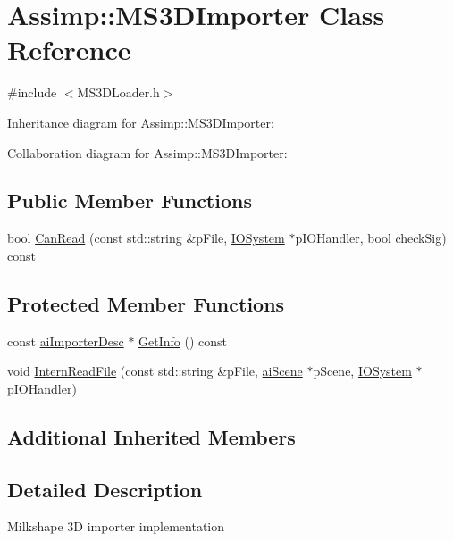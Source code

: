 \hypertarget{class_assimp_1_1_m_s3_d_importer}{\section{Assimp\+:\+:M\+S3\+D\+Importer Class Reference}
\label{class_assimp_1_1_m_s3_d_importer}
}


{\ttfamily \#include $<$M\+S3\+D\+Loader.\+h$>$}



Inheritance diagram for Assimp\+:\+:M\+S3\+D\+Importer\+:


Collaboration diagram for Assimp\+:\+:M\+S3\+D\+Importer\+:
\subsection*{Public Member Functions}
\begin{DoxyCompactItemize}
\item 
bool \hyperlink{class_assimp_1_1_m_s3_d_importer_ab3da09f930bba981ec97f32dffe1c23b}{Can\+Read} (const std\+::string \&p\+File, \hyperlink{class_assimp_1_1_i_o_system}{I\+O\+System} $\ast$p\+I\+O\+Handler, bool check\+Sig) const 
\end{DoxyCompactItemize}
\subsection*{Protected Member Functions}
\begin{DoxyCompactItemize}
\item 
const \hyperlink{structai_importer_desc}{ai\+Importer\+Desc} $\ast$ \hyperlink{class_assimp_1_1_m_s3_d_importer_a4546d12a0844b8f3f23c26924f95df03}{Get\+Info} () const 
\item 
void \hyperlink{class_assimp_1_1_m_s3_d_importer_a9784f255e62ab45c8232f83b27dd6762}{Intern\+Read\+File} (const std\+::string \&p\+File, \hyperlink{structai_scene}{ai\+Scene} $\ast$p\+Scene, \hyperlink{class_assimp_1_1_i_o_system}{I\+O\+System} $\ast$p\+I\+O\+Handler)
\end{DoxyCompactItemize}
\subsection*{Additional Inherited Members}


\subsection{Detailed Description}
Milkshape 3\+D importer implementation 

